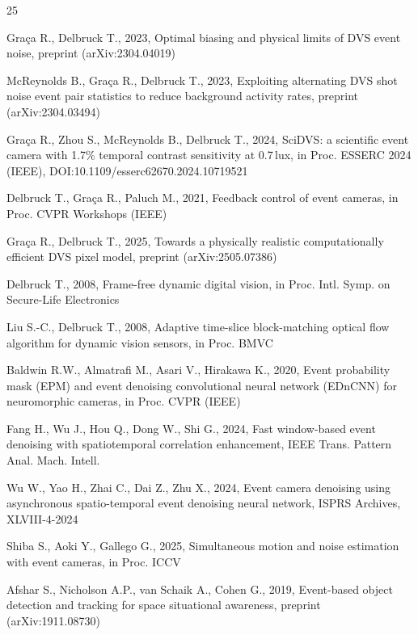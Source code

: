 \documentclass[twocolumn]{article}
\begin{document}
\begin{thebibliography}{25}

Gra\c{c}a R., Delbruck T., 2023,
Optimal biasing and physical limits of DVS event noise,
preprint (arXiv:2304.04019)

McReynolds B., Gra\c{c}a R., Delbruck T., 2023,
Exploiting alternating DVS shot noise event pair statistics to reduce background activity rates,
preprint (arXiv:2304.03494)

Gra\c{c}a R., Zhou S., McReynolds B., Delbruck T., 2024,
SciDVS: a scientific event camera with 1.7\% temporal contrast sensitivity at 0.7\,lux,
in Proc. ESSERC 2024 (IEEE), DOI:10.1109/esserc62670.2024.10719521

Delbruck T., Gra\c{c}a R., Paluch M., 2021,
Feedback control of event cameras,
in Proc. CVPR Workshops (IEEE)

Gra\c{c}a R., Delbruck T., 2025,
Towards a physically realistic computationally efficient DVS pixel model,
preprint (arXiv:2505.07386)

Delbruck T., 2008,
Frame-free dynamic digital vision,
in Proc. Intl. Symp. on Secure-Life Electronics

Liu S.-C., Delbruck T., 2008,
Adaptive time-slice block-matching optical flow algorithm for dynamic vision sensors,
in Proc. BMVC

Baldwin R.W., Almatrafi M., Asari V., Hirakawa K., 2020,
Event probability mask (EPM) and event denoising convolutional neural network (EDnCNN) for neuromorphic cameras,
in Proc. CVPR (IEEE)

Fang H., Wu J., Hou Q., Dong W., Shi G., 2024,
Fast window-based event denoising with spatiotemporal correlation enhancement,
IEEE Trans. Pattern Anal. Mach. Intell.

Wu W., Yao H., Zhai C., Dai Z., Zhu X., 2024,
Event camera denoising using asynchronous spatio-temporal event denoising neural network,
ISPRS Archives, XLVIII-4-2024

Shiba S., Aoki Y., Gallego G., 2025,
Simultaneous motion and noise estimation with event cameras,
in Proc. ICCV

Afshar S., Nicholson A.P., van Schaik A., Cohen G., 2019,
Event-based object detection and tracking for space situational awareness,
preprint (arXiv:1911.08730)


\end{thebibliography}
\end{document}
